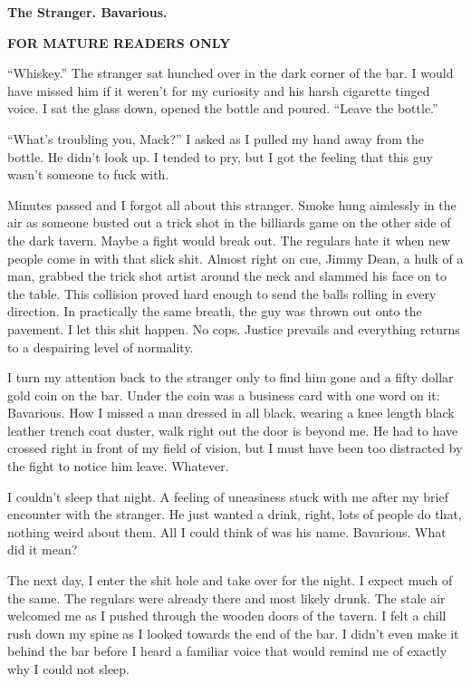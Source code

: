 {\bf The Stranger. Bavarious.}



{\bf FOR MATURE READERS ONLY}



``Whiskey.'' The stranger sat hunched over in the dark
corner of the bar. I would have missed him if it weren't for
my curiosity and his harsh cigarette tinged voice. I sat the glass
down, opened the bottle and poured. ``Leave the
bottle.''



``What's troubling you, Mack?'' I asked as I pulled
my hand away from the bottle. He didn't look up. I tended to
pry, but I got the feeling that this guy wasn't someone to
fuck with.



Minutes passed and I forgot all about this stranger. Smoke hung
aimlessly in the air as someone busted out a trick shot in the
billiards game on the other side of the dark tavern. Maybe a fight
would break out. The regulars hate it when new people come in with
that slick shit. Almost right on cue, Jimmy Dean, a hulk of a man,
grabbed the trick shot artist around the neck and slammed his face
on to the table. This collision proved hard enough to send the
balls rolling in every direction. In practically the same breath,
the guy was thrown out onto the pavement. I let this shit happen.
No cops. Justice prevails and everything returns to a despairing
level of normality.



I turn my attention back to the stranger only to find him gone and
a fifty dollar gold coin on the bar. Under the coin was a business
card with one word on it: Bavarious. How I missed a man dressed in
all black, wearing a knee length black leather trench coat duster,
walk right out the door is beyond me. He had to have crossed right
in front of my field of vision, but I must have been too distracted
by the fight to notice him leave. Whatever.



I couldn't sleep that night. A feeling of uneasiness stuck
with me after my brief encounter with the stranger. He just wanted
a drink, right, lots of people do that, nothing weird about them.
All I could think of was his name. Bavarious. What did it
mean?



The next day, I enter the shit hole and take over for the night. I
expect much of the same. The regulars were already there and most
likely drunk. The stale air welcomed me as I pushed through the
wooden doors of the tavern. I felt a chill rush down my spine as I
looked towards the end of the bar. I didn't even make it
behind the bar before I heard a familiar voice that would remind me
of exactly why I could not sleep.




